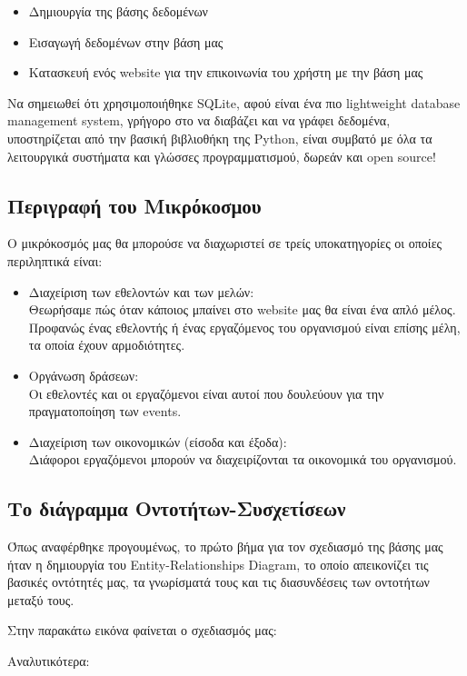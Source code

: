 \documentclass[manuscript,screen,review]{acmart}
\newcommand{\img}[1]
{
    \begin{center}
        \fcolorbox{black}{white}{\texttt{[image: \#1]}}
    \end{center}

}
\newcommand{\en}[1]{\foreignlanguage{english}{#1}}
\begin{document}
\begin{itemize}
    \item Δημιουργία της βάσης δεδομένων
    \item Εισαγωγή δεδομένων στην βάση μας
    \item Κατασκευή ενός \en{website} για την επικοινωνία του χρήστη με την βάση μας
\end{itemize}
 Να σημειωθεί ότι χρησιμοποιήθηκε \en{SQLite}, αφού είναι ένα πιο \en{lightweight database management system}, γρήγορο στο να διαβάζει και να γράφει δεδομένα, υποστηρίζεται από την βασική βιβλιοθήκη της \en{Python}, είναι συμβατό με όλα τα λειτουργικά συστήματα και γλώσσες προγραμματισμού, δωρεάν και \en{open source}!

\subsection{Περιγραφή του Μικρόκοσμου}
Ο μικρόκοσμός μας θα μπορούσε να διαχωριστεί σε τρείς υποκατηγορίες οι οποίες περιληπτικά είναι:
\begin{itemize}
    \item Διαχείριση των εθελοντών και των μελών:\\
    Θεωρήσαμε πώς όταν κάποιος μπαίνει στο \en{website} μας θα είναι ένα απλό μέλος. Προφανώς ένας εθελοντής ή ένας εργαζόμενος του οργανισμού είναι επίσης μέλη, τα οποία έχουν αρμοδιότητες.
    \item Οργάνωση δράσεων:\\
    Οι εθελοντές και οι εργαζόμενοι είναι αυτοί που δουλεύουν για την πραγματοποίηση των \en{events}.
    \item Διαχείριση των οικονομικών (είσοδα και έξοδα):\\
    Διάφοροι εργαζόμενοι μπορούν να διαχειρίζονται τα οικονομικά του οργανισμού.
\end{itemize}

\subsection{Tο διάγραμμα Οντοτήτων-Συσχετίσεων}

Όπως αναφέρθηκε προγουμένως, το πρώτο βήμα για τον σχεδιασμό της βάσης μας ήταν η δημιουργία του \en{Entity-Relationships Diagram}, το οποίο απεικονίζει τις βασικές οντότητές μας, τα γνωρίσματά τους και τις διασυνδέσεις των οντοτήτων μεταξύ τους.


Στην παρακάτω εικόνα φαίνεται ο σχεδιασμός μας:
\img{./images/erd.png}
Αναλυτικότερα:
\end{document}
